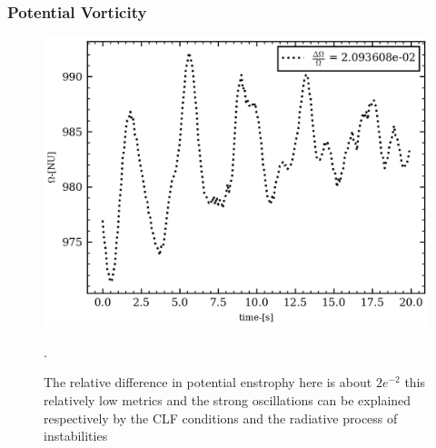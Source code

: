 \documentclass[11pt,a4paper]{report}
\begin{document}
\begin{multicols}{2}
    \subsubsection{Potential Vorticity}
    \phantom{doisa}
    \begin{figure}[H]
        \centering
        \includegraphics[width=1\linewidth]{./figure/potential_enstrophy_common_wave.png}
        \caption{The relative difference in potential enstrophy here is about $2e^{-2}$ this relatively low metrics and the strong oscillations can be explained respectively by the CLF conditions and the radiative process of instabilities}.
        \label{}
    \end{figure}

\end{multicols}
\end{document}
